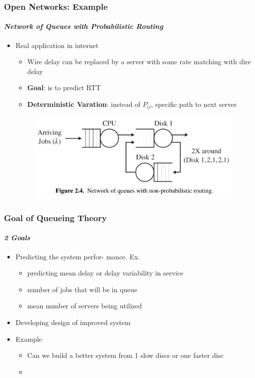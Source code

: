 \documentclass{beamer}
\begin{document}
\begin{frame}
    \frametitle{Open Networks: Example}
    \framesubtitle{\textbf{\textit{Network of Queues with Probabilistic Routing}}}
	\begin{itemize}
			
		\item Real application in internet
			\begin{itemize}
			\item Wire delay can be  replaced by a server with some rate matching with dire delay
			\item \textbf{Goal}: is to predict RTT
			\item \textbf{Deterministic Varation}: instead of $P_{ij}$, specific path to next 						server
			\end{itemize}
			\begin{figure}
        		\begin{center}
		            \includegraphics[scale=0.3]{images/deterministicopenqueue.jpg}
        		\end{center}
		    \end{figure}
		  
	\end{itemize}	    
    
\end{frame}




\begin{frame}
    \frametitle{Goal of Queueing Theory}
    \framesubtitle{\textbf{\textit{2 Goals}}}
	\begin{itemize}
		\item Predicting the system perfor- mance. Ex. 
		\begin{itemize}
			\item predicting mean delay or delay variability in service   
			\item number of jobs that will be in queue 
			\item mean number of servers being utilized
			\end{itemize}
		\item Developing design of improved system
		\item Example
			\begin{itemize}
			\item Can we build a better system from 1 slow discs or one faster disc
			\item 
			\end{itemize}
	\end{itemize}	    
    
\end{frame}



    
\end{document}
